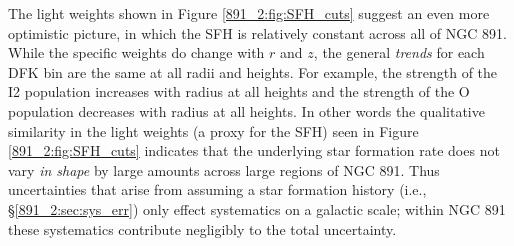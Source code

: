




The light weights shown in Figure \ref{891_2:fig:SFH_cuts} suggest an
even more optimistic picture, in which the SFH is relatively constant
across all of NGC 891. While the specific weights do change with $r$
and $z$, the general \emph{trends} for each DFK bin are the same at
all radii and heights. For example, the strength of the I2 population
increases with radius at all heights and the strength of the O
population decreases with radius at all heights.
In other words the qualitative similarity in the light weights (a
proxy for the SFH) seen in Figure \ref{891_2:fig:SFH_cuts} indicates
that the underlying star formation rate does not vary \emph{in shape}
by large amounts across large regions of NGC 891. Thus uncertainties
that arise from assuming a star formation history (i.e.,
\S\ref{891_2:sec:sys_err}) only effect systematics on a galactic
scale; within NGC 891 these systematics contribute negligibly to the
total uncertainty.

